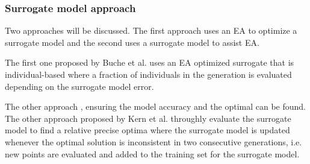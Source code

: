 
\subsubsection{Surrogate model approach}\label{sssec:surrogate_model_appraoch}\hfill

Two approaches will be discussed. The first approach uses an EA to optimize a surrogate model and the second uses a surrogate model to assist EA.

The first one proposed by Buche et al. \cite{1424193} uses an EA optimized surrogate that is individual-based where a fraction of individuals in the generation is evaluated depending on the surrogate model error. 


The other approach , ensuring the model accuracy and the optimal can be found. The other approach proposed by Kern et al. \cite{10.1007/11844297_95} throughly evaluate the surrogate model to find a relative precise optima where the surrogate model is updated whenever the optimal solution is inconsistent in two consecutive generations, i.e. new points are evaluated and added to the training set for the surrogate model.  












